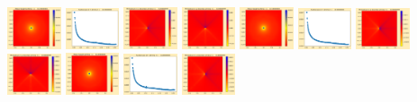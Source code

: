 \documentclass[11pt]{article}
\begin{document}
\vskip 10pt 
\includegraphics[width=0.11875\textwidth]{frame0082fig0.png}
\includegraphics[width=0.11875\textwidth]{frame0082fig1.png}
\includegraphics[width=0.11875\textwidth]{frame0082fig2.png}
\includegraphics[width=0.11875\textwidth]{frame0082fig3.png}
\includegraphics[width=0.11875\textwidth]{frame0083fig0.png}
\includegraphics[width=0.11875\textwidth]{frame0083fig1.png}
\includegraphics[width=0.11875\textwidth]{frame0083fig2.png}
\includegraphics[width=0.11875\textwidth]{frame0083fig3.png}
\vskip 10pt 
\includegraphics[width=0.11875\textwidth]{frame0084fig0.png}
\includegraphics[width=0.11875\textwidth]{frame0084fig1.png}
\includegraphics[width=0.11875\textwidth]{frame0084fig2.png}
\end{document}
